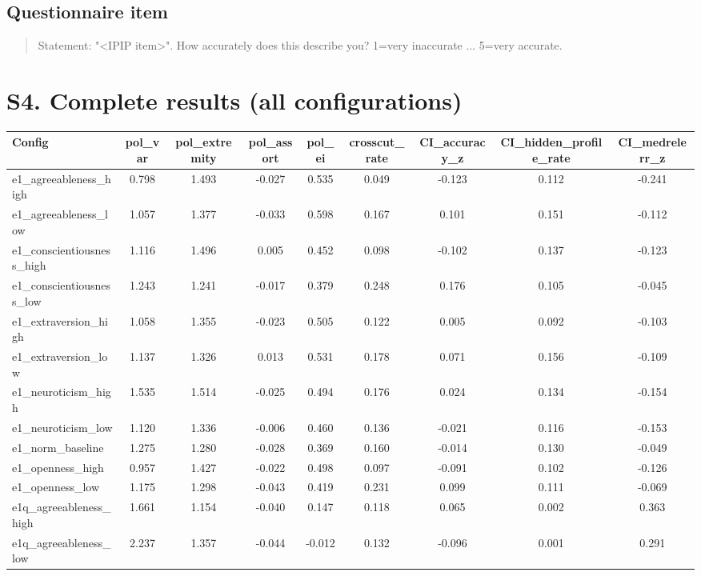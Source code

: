 \documentclass[11pt]{article}
\begin{document}
\subsection*{Questionnaire item}
\begin{quote}\small\ttfamily
[QUESTIONNAIRE] Statement: "<IPIP item>". How accurately does this describe you? 1=very inaccurate ... 5=very accurate.
\end{quote}

\section{S4. Complete results (all configurations)}
\begin{longtable}{lcccccccc}
\toprule
Config & pol\_var & pol\_extremity & pol\_assort & pol\_ei & crosscut\_rate & CI\_accuracy\_z & CI\_hidden\_profile\_rate & CI\_medrelerr\_z \\
\midrule
e1\_agreeableness\_high & 0.798 & 1.493 & -0.027 & 0.535 & 0.049 & -0.123 & 0.112 & -0.241 \\
e1\_agreeableness\_low & 1.057 & 1.377 & -0.033 & 0.598 & 0.167 & 0.101 & 0.151 & -0.112 \\
e1\_conscientiousness\_high & 1.116 & 1.496 & 0.005 & 0.452 & 0.098 & -0.102 & 0.137 & -0.123 \\
e1\_conscientiousness\_low & 1.243 & 1.241 & -0.017 & 0.379 & 0.248 & 0.176 & 0.105 & -0.045 \\
e1\_extraversion\_high & 1.058 & 1.355 & -0.023 & 0.505 & 0.122 & 0.005 & 0.092 & -0.103 \\
e1\_extraversion\_low & 1.137 & 1.326 & 0.013 & 0.531 & 0.178 & 0.071 & 0.156 & -0.109 \\
e1\_neuroticism\_high & 1.535 & 1.514 & -0.025 & 0.494 & 0.176 & 0.024 & 0.134 & -0.154 \\
e1\_neuroticism\_low & 1.120 & 1.336 & -0.006 & 0.460 & 0.136 & -0.021 & 0.116 & -0.153 \\
e1\_norm\_baseline & 1.275 & 1.280 & -0.028 & 0.369 & 0.160 & -0.014 & 0.130 & -0.049 \\
e1\_openness\_high & 0.957 & 1.427 & -0.022 & 0.498 & 0.097 & -0.091 & 0.102 & -0.126 \\
e1\_openness\_low & 1.175 & 1.298 & -0.043 & 0.419 & 0.231 & 0.099 & 0.111 & -0.069 \\
e1q\_agreeableness\_high & 1.661 & 1.154 & -0.040 & 0.147 & 0.118 & 0.065 & 0.002 & 0.363 \\
e1q\_agreeableness\_low & 2.237 & 1.357 & -0.044 & -0.012 & 0.132 & -0.096 & 0.001 & 0.291 \\

\end{longtable}
\end{document}
